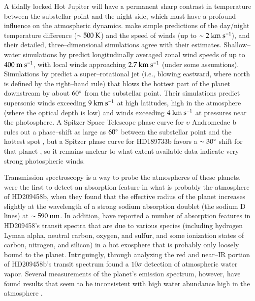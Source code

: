 A tidally locked Hot Jupiter will have a permanent sharp contrast in
temperature between the substellar point and the night side, which
must have a profound influence on the atmospheric dynamics.
\citet{showman+guillot2002} make simple predictions of the day/night
temperature difference ($\sim 500 {\rm ~K}$) and the speed of winds
(up to $\sim 2 {\rm ~km~s^{-1}}$), and their detailed,
three--dimensional simulations agree with their estimates.
Shallow--water simulations by \citet{cho_et_al2003} predict
longitudinally averaged zonal wind speeds of up to $400
{\rm~m~s^{-1}}$, with local winds approaching $2.7 {\rm~km~s^{-1}}$
(under some assumtions).  Simulations by \citet{cooper+showman2005}
predict a super--rotational jet (i.e., blowing eastward, where north
is defined by the right--hand rule) that blows the hottest part of the
planet downstream by about $60\mbox{$^\circ$}$ from the substellar point.  Their
simulations predict supersonic winds exceeding $9 {\rm~km~s^{-1}}$ at
high latitudes, high in the atmosphere (where the optical depth is
low) and winds exceeding $4 {\rm~km~s^{-1}}$ at pressures near the
photosphere.  A Spitzer Space Telescope phase curve for $\upsilon$
Andromedae b rules out a phase--shift as large as $60\mbox{$^\circ$}$ between
the substellar point and the hottest spot
\citep{harrington_et_al2006}, but a Spitzer phase curve for HD189733b
favors a $\sim 30\mbox{$^\circ$}$ shift for that planet
\citep{knutson_et_al2007b}, so it remains unclear to what extent
available data indicate very strong photospheric winds.

Transmission spectroscopy is a way to probe the atmospheres of these
planets.  \citet{charbonneau_et_al2002} were the first to detect an
absorption feature in what is probably the atmosphere of HD209458b,
when they found that the effective radius of the planet increases
slightly at the wavelength of a strong sodium absorption doublet (the
sodium D lines) at $\sim 590 {\rm~nm}$.  In addition,
\citet{vidal-madjar_et_al2003, vidal-madjar_et_al2004} have reported a
number of absorption features in HD209458's transit spectra that are
due to various species (including hydrogen Lyman alpha, neutral
carbon, oxygen, and sulfur, and some ionization states of carbon,
nitrogen, and silicon) in a hot exosphere that is probably only
loosely bound to the planet.  Intriguingly, through analyzing the red
and near--IR portion of HD209458b's transit spectrum
\citet{barman2007} found a $10 \sigma$ detection of atmospheric water
vapor.  Several measurements of the planet's emission spectrum,
however, have found results that seem to be inconsistent with high
water abundance high in the atmosphere \citep{grillmair_et_al2007,
richardson_et_al2007, swain_et_al2007}.

